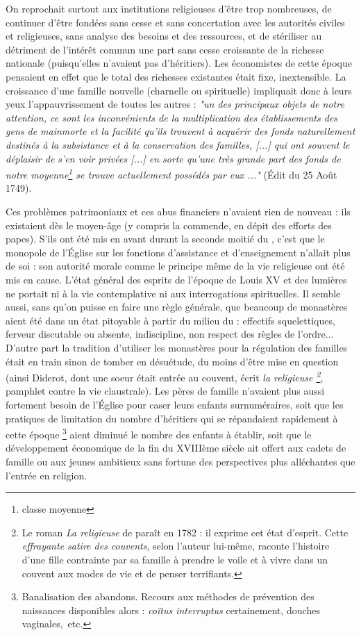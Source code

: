  On reprochait surtout aux institutions religieuses d'être trop nombreuses, de continuer d'être fondées sans cesse et sans concertation avec les autorités civiles et religieuses, sans analyse des besoins et des ressources, et de stériliser au détriment de l'intérêt commun une part sans cesse croissante de la richesse nationale (puisqu'elles n'avaient pas d'héritiers). Les économistes de cette époque pensaient en effet que le total des richesses existantes était fixe, inextensible. La croissance d'une famille nouvelle (charnelle ou spirituelle) impliquait donc à leurs yeux l'appauvrissement de toutes les autres : \emph{"un des principaux objets de notre attention, ce sont les inconvénients de la multiplication des établissements des gens de mainmorte et la facilité qu'ils trouvent à acquérir des fonds naturellement destinés à la subsistance et à la conservation des familles, \emph{[...]} qui ont souvent le déplaisir de s'en voir privées \emph{[...]} en sorte qu'une très grande part des fonds de notre moyenne\footnote{classe moyenne} se trouve actuellement possédés par eux ..."} (Édit du 25 Août 1749). 

 Ces problèmes patrimoniaux et ces abus financiers n'avaient rien de nouveau : ils existaient dès le moyen-âge (y compris la commende, en dépit des efforts des papes). S'ils ont été mis en avant durant la seconde moitié du , c'est que le monopole de l'Église sur les fonctions d'assistance et d'enseignement n'allait plus de soi : son autorité morale comme le principe même de la vie religieuse ont été mis en cause. L'état général des esprits de l'époque de Louis XV et des lumières ne portait ni à la vie contemplative ni aux interrogations spirituelles. Il semble aussi, sans qu'on puisse en faire une règle générale, que beaucoup de monastères aient été dans un état pitoyable à partir du milieu du  : effectifs squelettiques, ferveur discutable ou absente, indiscipline, non respect des règles de l'ordre... D'autre part la tradition d'utiliser les monastères pour la régulation des familles était en train sinon de tomber en désuétude, du moins d'être mise en question (ainsi Diderot, dont une soeur était entrée au couvent, écrit \emph{la religieuse 
\footnote{Le roman \emph{La religieuse} de  paraît en 1782 : il exprime cet état d'esprit. Cette \emph{effrayante satire des couvents}, selon l'auteur lui-même, raconte l'histoire d'une fille contrainte par sa famille à prendre le voile et à vivre dans un couvent aux modes de vie et de penser terrifiants.}}, pamphlet contre la vie claustrale). Les pères de famille n'avaient plus aussi fortement besoin de l'Église pour caser leurs enfants surnuméraires, soit que les pratiques de limitation du nombre d'héritiers qui se répandaient rapidement à cette époque%
\footnote{Banalisation des abandons. Recours aux méthodes de prévention des naissances disponibles alors : \emph{coïtus interruptus} certainement, douches vaginales,~etc.} 
aient diminué le nombre des enfants à établir, soit que le développement économique de la fin du XVIIIème siècle ait offert aux cadets de famille ou aux jeunes ambitieux sans fortune des perspectives plus alléchantes que l'entrée en religion.

